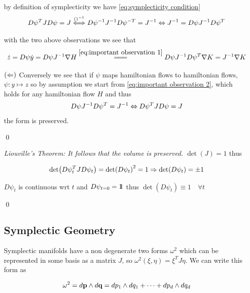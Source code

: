 \documentclass[12pt]{article}
\begin{document}
by definition of symplecticity we have \eqref{eq:symplecticity condition}
\begin{equation}\label{eq:symplecticity condition}
    D\psi^TJD\psi = J \stackrel{()^{-1}}{\Longleftrightarrow} D\psi^{-1}J^{-1}D\psi^{-T} = J^{-1} \Leftrightarrow J^{-1} = D\psi J^{-1} D\psi^T
\end{equation}

with the two above observations we see that 
\begin{equation}\label{eq:important observation 2}
    \dot z = D\psi \dot y = D\psi J^{-1}\nabla H \overset{\eqref{eq:important observation 1}}{\longlongeq} D\psi J^{-1} D\psi^T \nabla K = J^{-1}\nabla K
\end{equation}

$(\Leftarrow)$ Conversely we see that if $\psi$ maps hamiltonian flows to hamiltonian flows, $\psi : y\mapsto z$ so by assumption we start from \eqref{eq:important observation 2}, which holds for any hamiltonian flow $H$ and thus
$$D\psi J^{-1}D\psi^T = J^{-1} \Leftrightarrow D\psi^T JD\psi = J$$
the form is preserved.

\qed

 \textit{Liouville's Theorem: It follows that the volume is preserved.} $\det(J) = 1$ thus

$$
\det(D\psi_t^TJD\psi_t) = \det(D\psi_t)^2 = 1 \Rightarrow \det(D\psi_t)=\pm 1
$$

$D\psi_t$ is continuous wrt $t$ and $D\psi_{t=0}=1\!\!1$ thus $\det (D\psi_t)\equiv 1\quad\forall t$

\qed

\subsection{Symplectic Geometry}


Symplectic manifolds have a non degenerate two forms $\omega^2$ which can be represented in some basis as a matrix $J$, so $\omega^2(\xi,\eta) = \xi^TJ\eta$. We can write this form as

$$\omega^2 = d\textbf p \wedge d\textbf q = dp_1\wedge dq_1 + \cdots + d p_d\wedge dq_d$$
\end{document}
